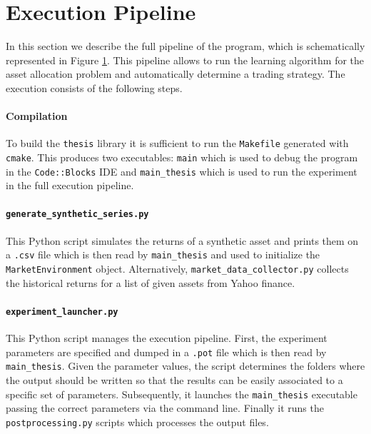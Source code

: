 \section{Execution Pipeline}
\label{sec:execution_pipeline}

In this section we describe the full pipeline of the program, which is schematically represented in Figure \ref{sec:execution_pipeline}. This pipeline allows to run the learning algorithm for the asset allocation problem and automatically determine a trading strategy. The execution consists of the following steps. 

\paragraph{Compilation} To build the \lstinline{thesis} library it is sufficient to run the \lstinline{Makefile} generated with \lstinline{cmake}. This produces two executables: \lstinline{main} which is used to debug the program in the \lstinline{Code::Blocks} IDE and \lstinline{main_thesis} which is used to run the experiment in the full execution pipeline. 

\paragraph{\lstinline{generate_synthetic_series.py}} This Python script simulates the returns of a synthetic asset and prints them on a \lstinline{.csv} file which is then read by \lstinline{main_thesis} and used to initialize the \lstinline{MarketEnvironment} object. Alternatively, \lstinline{market_data_collector.py} collects the historical returns for a list of given assets from Yahoo finance.

\paragraph{\lstinline{experiment_launcher.py}} This Python script manages the execution pipeline. First, the experiment parameters are specified and dumped in a \lstinline{.pot} file which is then read by \lstinline{main_thesis}. Given the parameter values, the script determines the folders where the output should be written so that the results can be easily associated to a specific set of parameters. Subsequently, it launches the \lstinline{main_thesis} executable passing the correct parameters via the command line. Finally it runs the \lstinline{postprocessing.py} scripts which processes the output files.  

